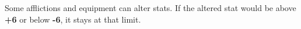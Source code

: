 
Some afflictions and equipment can alter stats. If the altered stat would be above \textbf{+6} or below \textbf{-6}, it stays at that limit.